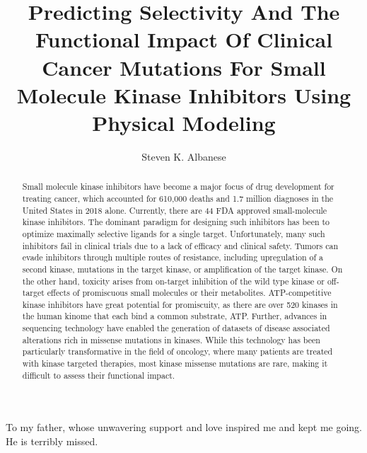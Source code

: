 \documentclass[phd,tocprelim]{cornell}
\title {Predicting Selectivity And The Functional Impact Of Clinical Cancer Mutations For Small Molecule Kinase Inhibitors Using Physical Modeling}
\author {Steven K. Albanese}
\DeclareRobustCommand{\gobblefive}[5]{}
\newcommand*{\SkipTocEntry}{\addtocontents{toc}{\gobblefive}}
\begin{document}
\maketitle
\makecopyright

\SkipTocEntry\begin{dedication}
	To my father, whose unwavering support and love inspired me and kept me going. He is terribly missed. 
\end{dedication}


\begin{abstract}
Small molecule kinase inhibitors have become a major focus of drug development for treating cancer, which accounted for 610,000 deaths and 1.7 million diagnoses in the United States in 2018 alone. Currently, there are 44 FDA approved small-molecule kinase inhibitors. The dominant paradigm for designing such inhibitors has been to optimize maximally selective ligands for a single target. Unfortunately, many such inhibitors fail in clinical trials due to a lack of efficacy and clinical safety. Tumors can evade inhibitors through multiple routes of resistance, including upregulation of a second kinase, mutations in the target kinase, or amplification of the target kinase. On the other hand, toxicity arises from on-target inhibition of the wild type kinase or off-target effects of promiscuous small molecules or their metabolites. ATP-competitive kinase inhibitors have great potential for promiscuity, as there are over 520 kinases in the human kinome that each bind a common substrate, ATP.  Further, advances in sequencing technology have enabled the generation of datasets of disease associated alterations rich in missense mutations in kinases. While this technology has been particularly transformative in the field of oncology, where many patients are treated with kinase targeted therapies, most kinase missense mutations are rare, making it difficult to assess their functional impact. 

\end{abstract}
\end{document}
